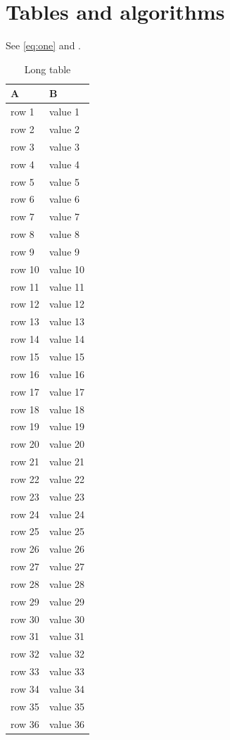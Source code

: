 \chapter{Tables and algorithms}\label{ch:two}
See \autoref{eq:one} and .
\begin{longtable}{ll}\caption{Long table}\label{tab:long}\\\toprule A & B\\\midrule\endhead
row 1 & value 1\\
row 2 & value 2\\
row 3 & value 3\\
row 4 & value 4\\
row 5 & value 5\\
row 6 & value 6\\
row 7 & value 7\\
row 8 & value 8\\
row 9 & value 9\\
row 10 & value 10\\
row 11 & value 11\\
row 12 & value 12\\
row 13 & value 13\\
row 14 & value 14\\
row 15 & value 15\\
row 16 & value 16\\
row 17 & value 17\\
row 18 & value 18\\
row 19 & value 19\\
row 20 & value 20\\
row 21 & value 21\\
row 22 & value 22\\
row 23 & value 23\\
row 24 & value 24\\
row 25 & value 25\\
row 26 & value 26\\
row 27 & value 27\\
row 28 & value 28\\
row 29 & value 29\\
row 30 & value 30\\
row 31 & value 31\\
row 32 & value 32\\
row 33 & value 33\\
row 34 & value 34\\
row 35 & value 35\\
row 36 & value 36\\

\end{longtable}
